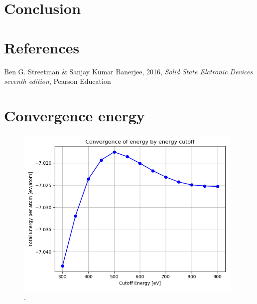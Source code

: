 \documentclass{article}
\begin{document}
\vspace{1cm}

\section{Conclusion}    \label{sec:Conclusion}


\vspace{1cm}

\section{References} \label{sec:References}

    \begin{thebibliography}{}

    Ben G. Streetman \& Sanjay Kumar Banerjee, 2016, \textit{Solid State Elctronic Devices seventh edition}, Pearson Education


    \end{thebibliography}



\appendix

\section{Convergence energy}

  \begin{figure}[H]
      \centering
      \includegraphics[width = 11cm]{../fig/convergence_energy.png}
      \caption{. }
      \label{fig:convergence_energy.png}
  \end{figure}
\end{document}
